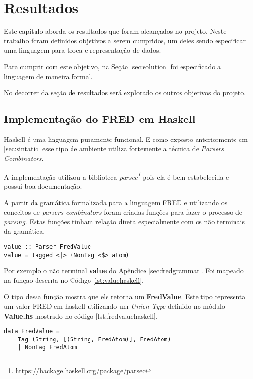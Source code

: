 \chapter[Resultados]{Resultados}

Este capítulo aborda os resultados que foram alcançados no projeto.
Neste trabalho foram definidos objetivos a serem cumpridos, um deles sendo especificar
uma linguagem para troca e representação de dados. 

Para cumprir com este objetivo, na Seção \ref{sec:solution} foi especificado 
a linguagem de maneira formal.

No decorrer da seção de resultados será explorado os outros objetivos do projeto.

\section{Implementação do FRED em Haskell}

Haskell é uma linguagem puramente funcional. E como exposto anteriormente em
\ref{sec:sintatic} esse tipo de ambiente utiliza fortemente a técnica 
de \textit{Parsers Combinators}.

A implementação utilizou a biblioteca 
\textit{parsec\footnote{https://hackage.haskell.org/package/parsec}}
pois ela é bem estabelecida e possui boa documentação.

A partir da gramática formalizada para a linguagem FRED e utilizando os
conceitos de \textit{parsers combinators} foram criadas funções para
fazer o processo de \textit{parsing}. Estas funções tinham relação
direta especialmente com os não terminais da gramática.

\begin{lstlisting}[caption=Parser para o não terminal value,label={lst:valuehaskell}]
value :: Parser FredValue
value = tagged <|> (NonTag <$> atom)
\end{lstlisting}

Por exemplo o não terminal \textbf{value} do Apêndice \ref{sec:fredgrammar}.
Foi mapeado na função descrita no Código \ref{lst:valuehaskell}. 

O tipo dessa função mostra que ele retorna um \textbf{FredValue}. 
Este tipo representa um valor FRED em haskell utilizando um 
\textit{Union Type} definido no módulo \textbf{Value.hs} 
mostrado no código \ref{lst:fredvaluehaskell}.

\begin{lstlisting}[caption=Definição do tipo FredValue,label={lst:fredvaluehaskell}]
data FredValue =
    Tag (String, [(String, FredAtom)], FredAtom) 
    | NonTag FredAtom
\end{lstlisting}

